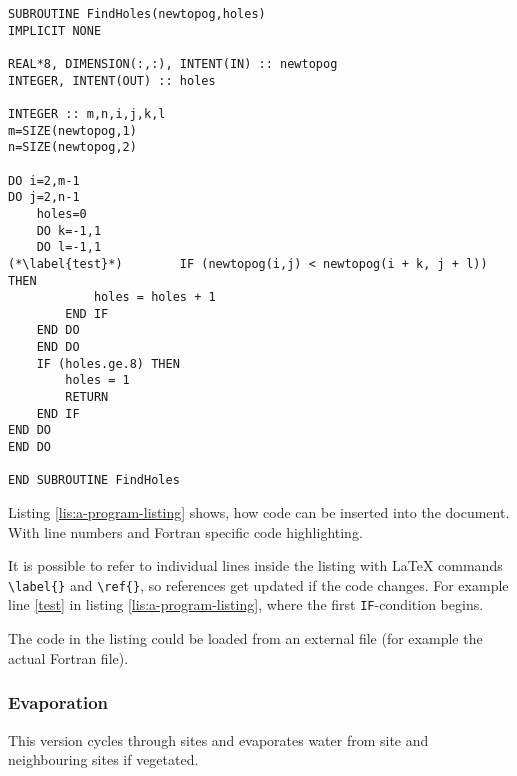 
\begin{lstlisting}[caption={a program listing could look like this;
notice the language sensitive formatting},label={lis:a-program-listing},breaklines=true,tabsize=4]
SUBROUTINE FindHoles(newtopog,holes) 
IMPLICIT NONE

REAL*8, DIMENSION(:,:), INTENT(IN) :: newtopog 
INTEGER, INTENT(OUT) :: holes

INTEGER :: m,n,i,j,k,l 
m=SIZE(newtopog,1) 
n=SIZE(newtopog,2)

DO i=2,m-1 
DO j=2,n-1   
    holes=0   
	DO k=-1,1   
	DO l=-1,1     
(*\label{test}*)		IF (newtopog(i,j) < newtopog(i + k, j + l)) THEN
	    	holes = holes + 1     
		END IF   
	END DO   
	END DO   
	IF (holes.ge.8) THEN     
		holes = 1     
		RETURN   
	END IF 
END DO 
END DO

END SUBROUTINE FindHoles
\end{lstlisting}


Listing \ref{lis:a-program-listing} shows, how code can be inserted
into the document. With line numbers and Fortran specific code highlighting. 

It is possible to refer to individual lines inside the listing with
\LaTeX{} commands \texttt{\textbackslash{}label\{\}} and \texttt{\textbackslash{}ref\{\}},
so references get updated if the code changes. For example line \ref{test}
in listing \ref{lis:a-program-listing}, where the first \texttt{IF}-condition
begins.

The code in the listing could be loaded from an external file (for
example the actual Fortran file). 


\subsubsection{Evaporation}


This version cycles through sites and evaporates water from site and
neighbouring sites if vegetated.


